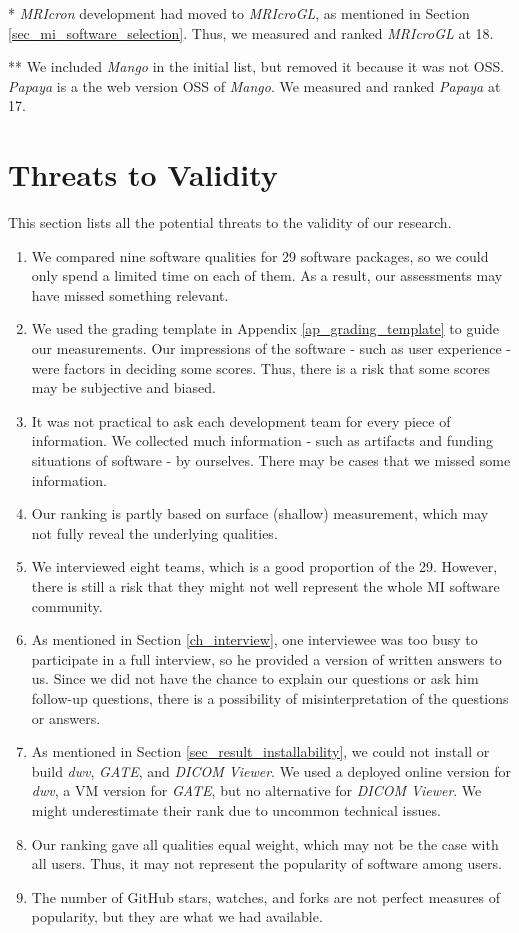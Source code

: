 * \textit{MRIcron} development had moved to \textit{MRIcroGL}, as mentioned in Section \ref{sec_mi_software_selection}. Thus, we measured and ranked \textit{MRIcroGL} at 18.

** We included \textit{Mango} in the initial list, but removed it because it was not OSS. \textit{Papaya} is a the web version OSS of \textit{Mango}. We measured and ranked \textit{Papaya} at 17.

\section{Threats to Validity}
\label{sec_threats_to_validity}
This section lists all the potential threats to the validity of our research.



\begin{enumerate}
\item We compared nine software qualities for 29 software packages, so we could only spend a limited time on each of them. As a result, our assessments may have missed something relevant.
\item We used the grading template in Appendix \ref{ap_grading_template} to guide our measurements. Our impressions of the software - such as user experience - were factors in deciding some scores. Thus, there is a risk that some scores may be subjective and biased.
\item It was not practical to ask each development team for every piece of information. We collected much information - such as artifacts and funding situations of software - by ourselves. There may be cases that we missed some information.
\item Our ranking is partly based on surface (shallow) measurement, which may not fully reveal the underlying qualities.
\item We interviewed eight teams, which is a good proportion of the 29. However, there is still a risk that they might not well represent the whole MI software community.
\item As mentioned in Section \ref{ch_interview}, one interviewee was too busy to participate in a full interview, so he provided a version of written answers to us. Since we did not have the chance to explain our questions or ask him follow-up questions, there is a possibility of misinterpretation of the questions or answers.
\item As mentioned in Section \ref{sec_result_installability}, we could not install or build \textit{dwv}, \textit{GATE}, and \textit{DICOM Viewer}. We used a deployed online version for \textit{dwv}, a VM version for \textit{GATE}, but no alternative for \textit{DICOM Viewer}. We might underestimate their rank due to uncommon technical issues.
\item Our ranking gave all qualities equal weight, which may not be the case with all users. Thus, it may not represent the popularity of software among users.
\item The number of GitHub stars, watches, and forks are not perfect measures of popularity, but they are what we had available.
\end{enumerate}
